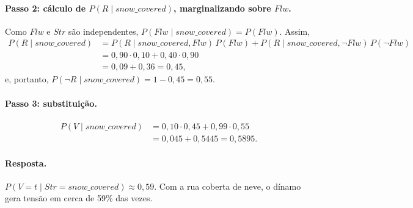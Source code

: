 \documentclass[12pt,a4paper]{article}
\newcommand{\Str}{\mathit{Str}}
\newcommand{\Flw}{\mathit{Flw}}
\newcommand{\snow}{\mathit{snow\_covered}}
\begin{document}
\paragraph{Passo 2: cálculo de $P(R \mid \snow)$, marginalizando sobre $\Flw$.}
Como $\Flw$ e $\Str$ são independentes, $P(\Flw \mid \snow) = P(\Flw)$. Assim,
\begin{align*}
P(R \mid \snow)
 &= P(R \mid \snow, \Flw)\, P(\Flw) + P(R \mid \snow, \neg \Flw)\, P(\neg \Flw) \\
 &= 0{,}90 \cdot 0{,}10 + 0{,}40 \cdot 0{,}90 \\
 &= 0{,}09 + 0{,}36 = 0{,}45 ,
\end{align*}
e, portanto, $P(\neg R \mid \snow) = 1 - 0{,}45 = 0{,}55$.

\paragraph{Passo 3: substituição.}
\begin{align*}
P(V \mid \snow) &= 0{,}10 \cdot 0{,}45 + 0{,}99 \cdot 0{,}55 \\
                &= 0{,}045 + 0{,}5445 = 0{,}5895 .
\end{align*}

\paragraph{Resposta.} $P(V = t \mid \Str = \mathit{snow\_covered}) \approx 0{,}59$. Com a rua coberta de
neve, o dínamo gera tensão em cerca de 59\% das vezes.
\end{document}
